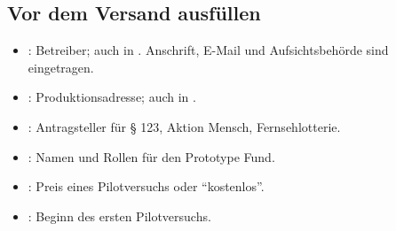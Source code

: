 \documentclass[10pt,parskip=half-]{scrartcl}
\begin{document}
\subsection*{Vor dem Versand ausfüllen}
{\small
\begin{itemize}[nosep]
  \item {}: Betreiber; auch in . Anschrift,
        E-Mail und Aufsichtsbehörde sind eingetragen.
  \item {}: Produktionsadresse; auch in .
  \item {}: Antragsteller für § 123, Aktion Mensch, Fernsehlotterie.
  \item {}: Namen und Rollen für den Prototype Fund.
  \item {}: Preis eines Pilotversuchs oder \enquote{kostenlos}.
  \item {}: Beginn des ersten Pilotversuchs.
\end{itemize}
}
\end{document}

